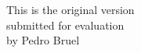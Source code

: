 \documentclass[12pt,twoside,a4paper]{book}
\begin{document}
    \vskip 2cm

    \begin{flushright}
    This is the original version\\
    submitted for evaluation\\
    by Pedro Bruel
    \end{flushright}

\pagebreak


%
%
%
%
%
%
%
%
%
%
%
\end{document}
